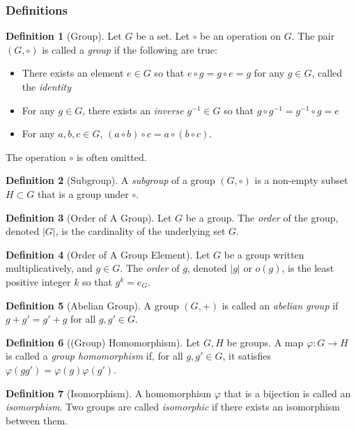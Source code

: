 \documentclass{article}
\theoremstyle{definition}
\newtheorem{definition}{Definition}[subsection]
\begin{document}
\subsubsection{Definitions}
\begin{definition}[Group]
    Let $G$ be a set. Let $\circ$ be an operation on $G$. The pair $(G,\circ)$ is called a \textit{group} if the following are true:
    \begin{itemize}
        \item There exists an element $e \in G$ so that $e\circ g = g \circ e = g$ for any $g\in G$, called the \textit{identity}
        \item For any $g\in G$, there exists an \textit{inverse} $g^{-1}\in G$ so that $g\circ g^{-1}=g^{-1}\circ g = e$
        \item For any $a,b,c\in G$, $(a\circ b)\circ c=a\circ(b\circ c)$.
    \end{itemize}
    The operation $\circ$ is often omitted.
\end{definition}
\begin{definition}[Subgroup]
    A \textit{subgroup} of a group $(G,\circ)$ is a non-empty subset $H\subset G$ that is a group under $\circ$.
\end{definition}
\begin{definition}[Order of A Group]
    Let $G$ be a group. The \textit{order} of the group, denoted $|G|$, is the cardinality of the underlying set $G$.
\end{definition}
\begin{definition}[Order of A Group Element]
    Let $G$ be a group written multiplicatively, and $g\in G$. The \textit{order} of $g$, denoted $|g|$ or $o(g)$, is the least positive integer $k$ so that $g^k=e_G$.
\end{definition}
\begin{definition}[Abelian Group]
    A group $(G,+)$ is called an \textit{abelian group} if $g+g'=g'+g$ for all $g,g'\in G$.
\end{definition}
\begin{definition}[(Group) Homomorphism]
    Let $G,H$ be groups. A map $\varphi: G\rightarrow H$ is called a \textit{group homomorphism} if, for all $g,g'\in G$, it satisfies $\varphi(gg')=\varphi(g)\varphi(g')$.
\end{definition}
\begin{definition}[Isomorphism]
    A homomorphism $\varphi$ that is a bijection is called an \textit{isomorphism}. Two groups are called \textit{isomorphic} if there exists an isomorphism between them.
\end{definition}
\end{document}
